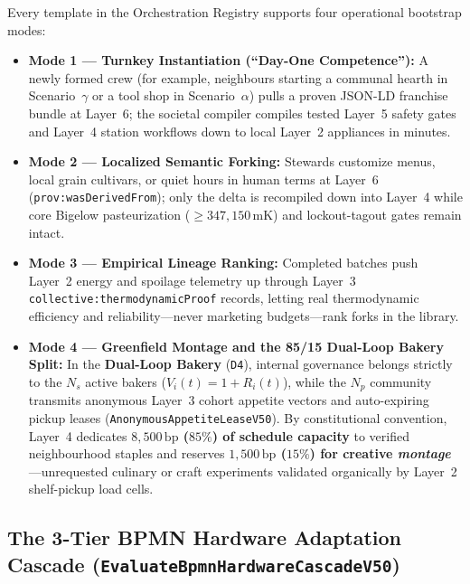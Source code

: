 Every template in the Orchestration Registry supports four operational bootstrap modes:
\begin{itemize}
  \item \textbf{Mode 1 --- Turnkey Instantiation (``Day-One Competence''):} A newly formed crew (for example, neighbours starting a communal hearth in Scenario~$\gamma$ or a tool shop in Scenario~$\alpha$) pulls a proven JSON-LD franchise bundle at Layer~6; the societal compiler compiles tested Layer~5 safety gates and Layer~4 station workflows down to local Layer~2 appliances in minutes.
  \item \textbf{Mode 2 --- Localized Semantic Forking:} Stewards customize menus, local grain cultivars, or quiet hours in human terms at Layer~6 (\texttt{prov:wasDerivedFrom}); only the delta is recompiled down into Layer~4 while core Bigelow pasteurization ($\ge 347{,}150\,\mathrm{mK}$) and lockout-tagout gates remain intact.
  \item \textbf{Mode 3 --- Empirical Lineage Ranking:} Completed batches push Layer~2 energy and spoilage telemetry up through Layer~3 \texttt{collective:thermodynamicProof} records, letting real thermodynamic efficiency and reliability---never marketing budgets---rank forks in the library.
  \item \textbf{Mode 4 --- Greenfield Montage and the 85/15 Dual-Loop Bakery Split:} In the \textbf{Dual-Loop Bakery} (\texttt{D4}), internal governance belongs strictly to the $N_s$ active bakers ($V_i(t) = 1 + R_i(t)$), while the $N_p$ community transmits anonymous Layer~3 cohort appetite vectors and auto-expiring pickup leases (\texttt{AnonymousAppetiteLeaseV50}). By constitutional convention, Layer~4 dedicates \textbf{$8{,}500\,\mathrm{bp}$ ($85\%$) of schedule capacity} to verified neighbourhood staples and reserves \textbf{$1{,}500\,\mathrm{bp}$ ($15\%$) for creative \textit{montage}}---unrequested culinary or craft experiments validated organically by Layer~2 shelf-pickup load cells.
\end{itemize}

\subsection{The 3-Tier BPMN Hardware Adaptation Cascade (\texttt{EvaluateBpmnHardwareCascadeV50})}

